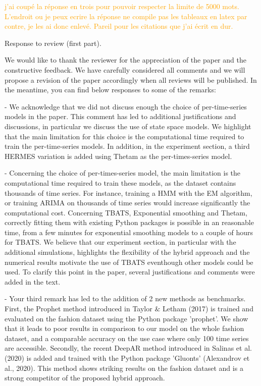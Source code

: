\documentclass[10pt]{article} %
\begin{document}
\textcolor{orange}{j'ai coupé la réponse en trois pour pouvoir respecter la limite de 5000 mots. L'endroit ou je peux ecrire la réponse ne compile pas les tableaux en latex par contre, je les ai donc enlevé. Pareil pour les citations que j'ai écrit en dur.}
\bigskip

Response to review (first part).\vspace{0.2cm}

We would like to thank the reviewer for the appreciation of the paper and the constructive feedback. We have carefully considered all comments and we will propose a revision of the paper accordingly when all reviews will be published. In the meantime, you can find below responses to some of the remarks:


- We acknowledge that we did not discuss enough the choice of per-time-series models in the paper. This comment has led to additional justifications and discussions, in particular we discuss the use of state space models. We highlight that the main limitation for this choice is the computational time required to train the per-time-series models. In addition, in the experiment section, a third HERMES variation is added using Thetam as the per-times-series model.
	
- Concerning the choice of per-times-series model, the main limitation is the computational time required to train these models, as the dataset contains thousands of time series. For instance, training a HMM with the EM algorithm, or training ARIMA on thousands of time series would increase significantly the computational cost. Concerning TBATS, Exponential smoothing and Thetam, correctly fitting them with existing Python packages is possible in an reasonable time, from a few minutes for exponential smoothing models to a couple of hours for TBATS. We believe that our experiment section, in particular with the additional simulations, highlights the flexibility of the hybrid approach and the numerical results motivate the use of TBATS eventhough other models could be used. To clarify this point in the paper, several justifications and comments were added in the text.
	
- Your third remark has led to the addition of 2 new methods as benchmarks. First, the Prophet method introduced in Taylor $\&$ Letham (2017) is trained and evaluated on the fashion dataset using the Python package 'prophet'. We show that it leads to poor results in comparison to our model on the whole fashion dataset, and a comparable accuracy on the use case where only 100 time series are accessible. Secondly, the recent DeepAR method introduced in Salinas et al. (2020) is added  and trained with the Python package 'Gluonts' (Alexandrov et al., 2020). This method shows striking results on the fashion dataset and is a strong competitor of the proposed hybrid approach.
\end{document}
